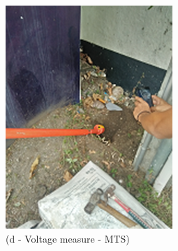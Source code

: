 \begin{figure}[!h]
\begin{minipage}[b]{0.3\linewidth}
	\includegraphics[width=\textwidth]{figures/fig_ch04_elecaudit_grounding_voltage_mts}
	\caption*{(d - Voltage measure - MTS)}
\end{minipage}
	\hspace{0.03cm}
\begin{minipage}[b]{0.3\linewidth}
	\centering

\end{minipage}
\end{figure}
